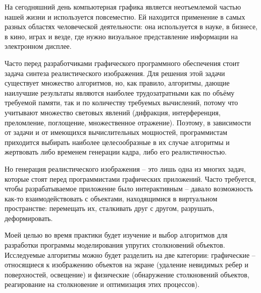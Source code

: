 
На сегодняшний день компьютерная графика является неотъемлемой частью
нашей жизни и используется повсеместно. Ей находится применение в самых разных
областях человеческой деятельности: она используется в науке, в бизнесе, в
кино, играх и везде, где нужно визуальное представление информации на
электронном дисплее. \cite{kurov}

Часто перед разработчиками графического программного обеспечения
стоит задача синтеза реалистического изображения. Для решения этой задачи
существует множество алгоритмов, но, как правило, алгоритмы, дающие наилучшие
результаты являются наиболее трудозатратными как по объёму требуемой памяти,
так и по количеству требуемых вычислений, потому что учитывают множество
световых явлений (дифракция, интерференция, преломление, поглощение,
множественное отражение). Поэтому, в зависимости от задачи и от имеющихся
вычислительных мощностей, программистам приходится выбирать наиболее
целесообразные в их случае алгоритмы и жертвовать либо временем генерации
кадра, либо его реалистичностью.

Но генерация реалистического изображения -- это лишь одна из многих
задач, которые стоят перед программистами графических приложений. Часто
требуется, чтобы разрабатываемое приложение было интерактивным -- давало
возможность как-то взаимодействовать с объектами, находящимися в виртуальном
пространстве: перемещать их, сталкивать друг с другом, разрушать,
деформировать.

Моей целью во время практики будет изучение и выбор алгоритмов для
разработки программы моделирования упругих столкновений объектов. Исследуемые
алгоритмы можно будет разделить на две категории: графические -- относящиеся к
изображению объектов на экране (удаление невидимых ребер и поверхностей,
освещение) и физические (обнаружение столкновений объектов, реагирование на
столкновение и оптимизация этих процессов). %


